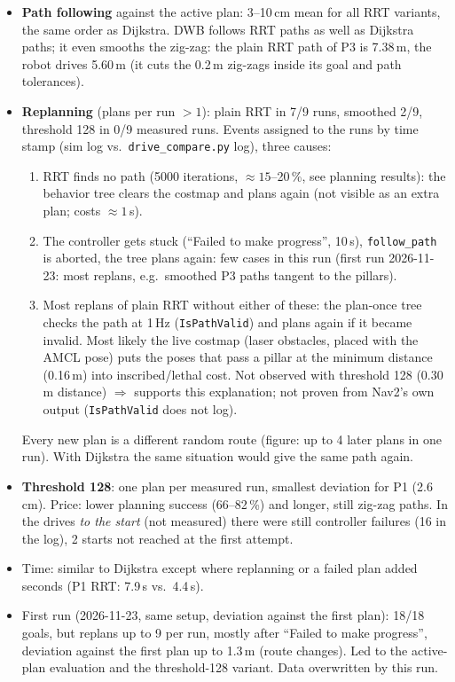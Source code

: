 \documentclass[10pt]{article}
\newcommand{\pkg}[1]{\texttt{#1}}
\begin{document}
\begin{itemize}
  \item \textbf{Path following} against the active plan: 3--10\,cm mean for all RRT variants, the same order as
        Dijkstra. DWB follows RRT paths as well as Dijkstra paths; it even smooths the zig-zag: the plain RRT path of P3
        is 7.38\,m, the robot drives 5.60\,m (it cuts the 0.2\,m zig-zags inside its goal and path tolerances).
  \item \textbf{Replanning} (plans per run $> 1$): plain RRT in 7/9 runs, smoothed 2/9, threshold 128 in 0/9 measured
        runs. Events assigned to the runs by time stamp (sim log vs.\ \pkg{drive\_compare.py} log), three causes:
        \begin{enumerate}
          \item RRT finds no path (5000 iterations, $\approx 15$--20\,\%, see planning results): the behavior tree clears
                the costmap and plans again (not visible as an extra plan; costs $\approx 1$\,s).
          \item The controller gets stuck (``Failed to make progress'', 10\,s), \pkg{follow\_path} is aborted, the tree plans
                again: few cases in this run (first run 2026-11-23: most replans, e.g.\ smoothed P3 paths tangent to
                the pillars).
          \item Most replans of plain RRT without either of these: the plan-once tree checks the path at 1\,Hz
                (\pkg{IsPathValid}) and plans again if it became invalid. Most likely the live costmap (laser obstacles,
                placed with the AMCL pose) puts the poses that pass a pillar at the minimum distance (0.16\,m) into
                inscribed/lethal cost. Not observed with threshold 128 (0.30\,m distance) $\Rightarrow$ supports this
                explanation; not proven from Nav2's own output (\pkg{IsPathValid} does not log).
        \end{enumerate}
        Every new plan is a different random route (figure: up to 4 later plans in one run). With Dijkstra the same
        situation would give the same path again.
  \item \textbf{Threshold 128}: one plan per measured run, smallest deviation for P1 (2.6\,cm). Price: lower planning
        success (66--82\,\%) and longer, still zig-zag paths. In the drives \emph{to the start} (not measured) there
        were still controller failures (16 in the log), 2 starts not reached at the first attempt.
  \item Time: similar to Dijkstra except where replanning or a failed plan added seconds (P1 RRT: 7.9\,s vs.\ 4.4\,s).
  \item First run (2026-11-23, same setup, deviation against the first plan): 18/18 goals, but replans up to 9 per run,
        mostly after ``Failed to make progress'', deviation against the first plan up to 1.3\,m (route changes). Led to the
        active-plan evaluation and the threshold-128 variant. Data overwritten by this run.
\end{itemize}
\end{document}
